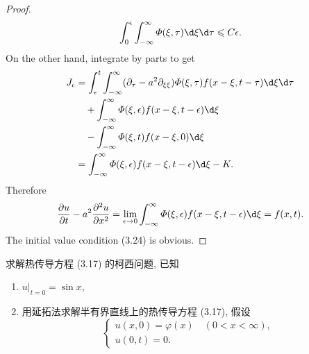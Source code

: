 \begin{proof}
\begin{equation}
      \int_0^\epsilon \int_{-\infty}^\infty \varPhi(\xi,\tau) \d\xi\d\tau \leq C\epsilon.
  \end{equation}
  On the other hand, integrate by parts to get
  \begin{equation}\label{eq:d4}
    \begin{aligned}
      J_\epsilon
      & = \int_\epsilon^t \int_{-\infty}^\infty (\partial_\tau - a^2\partial_{\xi\xi}) \varPhi(\xi,\tau)
          f(x-\xi,t-\tau) \d\xi\d\tau \\
      &   \quad + \int_{-\infty}^\infty \varPhi(\xi,\epsilon) f(x-\xi,t-\epsilon) \d\xi \\
      &   \quad - \int_{-\infty}^\infty \varPhi(\xi,t) f(x-\xi,0) \d\xi \\
      & = \int_{-\infty}^\infty \varPhi(\xi,\epsilon) f(x-\xi,t-\epsilon) \d\xi - K.
    \end{aligned}
  \end{equation}
  Therefore
  \begin{equation}\label{eq:d5}
    \frac{\partial u}{\partial t} - a^2\frac{\partial^2u}{\partial x^2}
      = \lim_{\epsilon\to 0} \int_{-\infty}^\infty \varPhi(\xi,\epsilon) f(x-\xi,t-\epsilon) \d\xi
      = f(x,t).
  \end{equation}
  The initial value condition (3.24) is obvious.
\end{proof}


\begin{exercise}[5]
  求解热传导方程 (3.17) 的柯西问题, 已知
  \begin{enumerate}[(1)]
    \item $u|_{t=0} = \sin x$,
    \item 用延拓法求解半有界直线上的热传导方程 (3.17), 假设
      \[\begin{cases}
        u(x,0) = \varphi(x)\quad (0<x<\infty), \\
        u(0,t) = 0.
      \end{cases}\]
  \end{enumerate}
\end{exercise}

